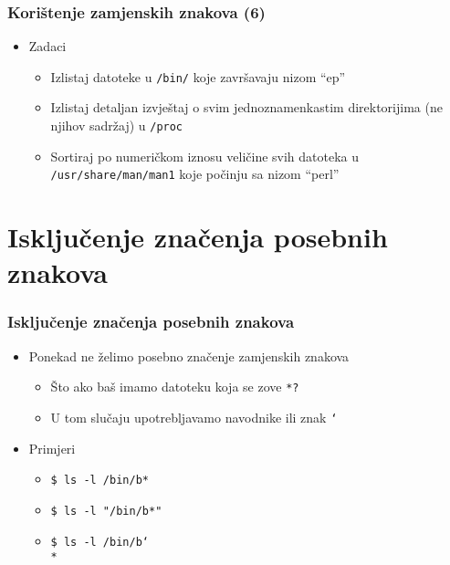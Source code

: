 \documentclass[table,usenames,dvipsnames]{beamer}
\newcommand{\shell}[1]{\texttt{#1}}
\begin{document}
\begin{frame}[t]
\frametitle{Korištenje zamjenskih znakova (6)}
\begin{itemize}
  \item Zadaci
  \begin{itemize}
    \item Izlistaj datoteke u \shell{/bin/} koje završavaju nizom ``ep''
    \item Izlistaj detaljan izvještaj o svim jednoznamenkastim 
          direktorijima (ne njihov sadržaj) u \shell{/proc}
    \item Sortiraj po numeričkom iznosu veličine svih datoteka u 
          \shell{/usr/share/man/man1} koje počinju sa nizom “perl”
  \end{itemize}
\end{itemize}
\end{frame}

\section{Isključenje značenja posebnih znakova}
\begin{frame}[t]
\frametitle{Isključenje značenja posebnih znakova}
\begin{itemize}
  \item Ponekad ne želimo posebno značenje zamjenskih znakova
  \begin{itemize}
    \item Što ako baš imamo datoteku koja se zove \shell{*?}
    \item U tom slučaju upotrebljavamo navodnike ili znak 
          \shell{\char`\\}
  \end{itemize}
  \item Primjeri
  \begin{itemize}
    \item[] \shell{\$ ls -l /bin/b*}
    \item[] \shell{\$ ls -l "/bin/b*"}
    \item[] \shell{\$ ls -l /bin/b\char`\\{}*}
  \end{itemize}
\end{itemize}
\end{frame}
\end{document}
